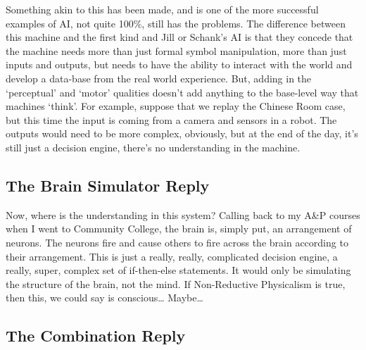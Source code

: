     Something akin to this has been made, and is one of the more successful examples of AI, not quite 100\%, still has the problems. The difference between this machine and the first kind and Jill or Schank's AI is that they concede that the machine needs more than just formal symbol manipulation, more than just inputs and outputs, but needs to have the ability to interact with the world and develop a data-base from the real world experience. But, adding in the `perceptual' and `motor' qualities doesn't add anything to the base-level way that machines `think'. For example, suppose that we replay the Chinese Room case, but this time the input is coming from a camera and sensors in a robot. The outputs would need to be more complex, obviously, but at the end of the day, it's still just a decision engine, there's no understanding in the machine.
    \subsection{The Brain Simulator Reply}


    Now, where is the understanding in this system? Calling back to my A\&P courses when I went to Community College, the brain is, simply put, an arrangement of neurons. The neurons fire and cause others to fire across the brain according to their arrangement. This is just a really, really, complicated decision engine, a really, super, complex set of if-then-else statements.  It would only be simulating the structure of the brain, not the mind. If Non-Reductive Physicalism is true, then this, we could say is conscious… Maybe…
\subsection{The Combination Reply}


